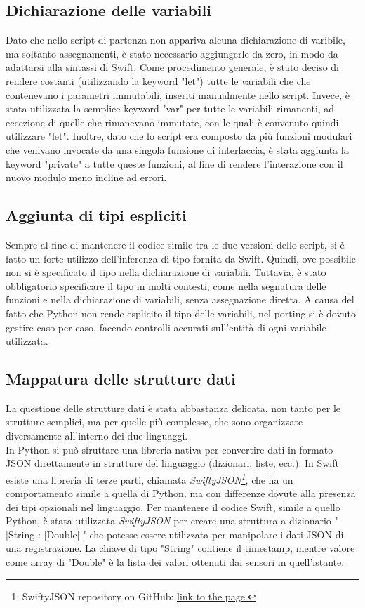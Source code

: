 \subsection{Dichiarazione delle variabili}

Dato che nello script di partenza non appariva alcuna dichiarazione di varibile,
ma soltanto assegnamenti, è stato necessario aggiungerle da zero, in modo da 
adattarsi alla sintassi di Swift. Come procedimento generale, è stato deciso
di rendere costanti (utilizzando la keyword "let") tutte le variabili che 
che contenevano i parametri immutabili, inseriti manualmente nello script.
Invece, è stata utilizzata la semplice keyword "var" per tutte le variabili 
rimanenti, ad eccezione di quelle che rimanevano immutate, con le quali è 
convenuto quindi utilizzare "let". Inoltre, dato che lo script era composto 
da più funzioni modulari che venivano invocate da una singola funzione di
interfaccia, è stata aggiunta la keyword "private" a tutte queste funzioni,
al fine di rendere l'interazione con il nuovo modulo meno incline ad errori.

\subsection{Aggiunta di tipi espliciti}

Sempre al fine di mantenere il codice simile tra le due versioni dello script,
si è fatto un forte utilizzo dell'inferenza di tipo fornita da Swift. Quindi,
ove possibile non si è specificato il tipo nella dichiarazione di variabili.
Tuttavia, è stato obbligatorio specificare il tipo in molti contesti, come
nella segnatura delle funzioni e nella dichiarazione di variabili, senza 
assegnazione diretta. A causa del fatto che Python non rende esplicito
il tipo delle variabili, nel porting si è dovuto gestire caso per caso,
facendo controlli accurati sull'entità di ogni variabile utilizzata.

\subsection{Mappatura delle strutture dati}

La questione delle strutture dati è stata abbastanza delicata, non tanto
per le strutture semplici, ma per quelle più complesse, che sono 
organizzate diversamente all'interno dei due linguaggi.\\
In Python si può sfruttare una libreria nativa per convertire dati in 
formato JSON direttamente in strutture del linguaggio (dizionari, liste, ecc.).
In Swift esiste una libreria di terze parti, chiamata \emph{SwiftyJSON\footnote{
SwiftyJSON repository on GitHub: 
\href{https://github.com/SwiftyJSON/SwiftyJSON}{\underline{link to the page.}}}}, che
ha un comportamento simile a quella di Python, ma con differenze dovute alla
presenza dei tipi opzionali nel linguaggio. Per mantenere il codice Swift, simile
a quello Python, è stata utilizzata \emph{SwiftyJSON} per creare una struttura a 
dizionario "[String : [Double]]" che potesse essere utilizzata per manipolare i 
dati JSON di una registrazione. La chiave di tipo "String" contiene il timestamp,
mentre valore come array di "Double" è la lista dei valori ottenuti dai sensori in 
quell'istante. 

